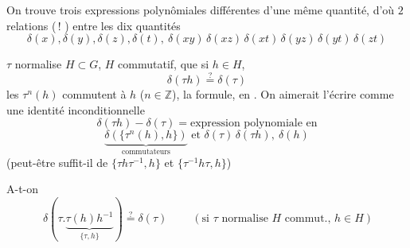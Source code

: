 \documentclass[11pt,a4paper]{article}
\begin{document}
On trouve trois expressions polynômiales différentes d'une même quantité, d'où $2$ relations (\,! ) entre les dix quantités
\[
  \delta(x),\delta(y),\delta(z),\delta(t),\ \delta(xy)\,\delta(xz)\,\delta(xt)\,\delta(yz)\,\delta(yt)\,\delta(zt)
\]
\struck{\ill{} \ill{} \ill{} \ill{}}

$\tau$ normalise $H\subset G$, $H$ commutatif,  que si $h\in H$,
\[
  \boxed{\ \delta(\tau h) \overset{?}{=} \delta(\tau)\ }
\]
 les $\tau^n(h)$  commutent à $h$ ($n\in\mathbb{Z}$), \ill{} \ill{} la formule, en . On aimerait l'écrire comme une identité inconditionnelle  
\[
  \delta(\tau h) - \delta(\tau) = \text{expression polynomiale en}
\]
\[
  \underbrace{\delta(\{\tau^{n}(h), h\})}_{\text{commutateurs}} \text{ et } \delta(\tau)\,\delta(\tau h),\ \delta(h)
\]
(peut-être suffit-il de $\{\tau h\tau^{-1}, h\}$ et $\{\tau^{-1}h\tau, h\}$)

A-t-on 
\[
  \boxed{\ \delta(\tau.\underbrace{\tau(h)h^{-1}}_{\{\tau,h\}}) \overset{?}{=} \delta(\tau)\ }
  \qquad (\text{si } \tau \text{ normalise } H \text{ commut., } h\in H)
\]

\end{document}
